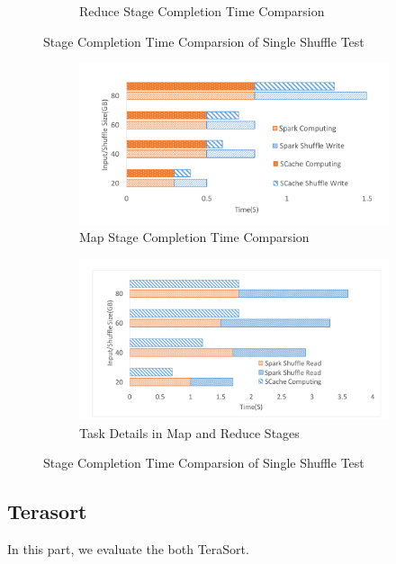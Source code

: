 \begin{figure}
\begin{subfigure}{\linewidth}
	\caption{Reduce Stage Completion Time Comparsion}
	\label{fig:reducestage}
\end{subfigure}
\caption{Stage Completion Time Comparsion of Single Shuffle Test}
\label{fig:singleshuffle}
\end{figure}

\begin{figure}
\begin{subfigure}{\linewidth}
	\includegraphics[width=\linewidth]{fig/groupbymaptask}
	\caption{Map Stage Completion Time Comparsion}
	\label{fig:maptask}
\end{subfigure}
\begin{subfigure}{\linewidth}
	\includegraphics[width=\linewidth]{fig/groupbyreducetask}
	\caption{Task Details in Map and Reduce Stages}
	\label{fig:reducetask}
\end{subfigure}
\caption{Stage Completion Time Comparsion of Single Shuffle Test}
\label{fig:singleshuffletask}
\end{figure}


\subsection{Terasort}
In this part, we evaluate the both TeraSort\cite{spark-tera}. 

